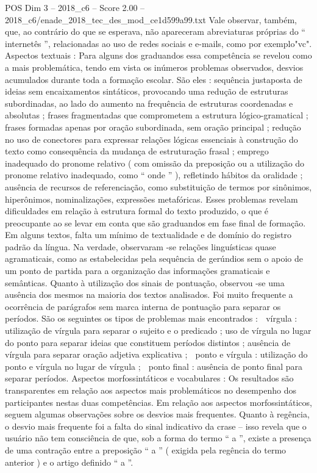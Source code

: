 \begin{textsample}{POS Dim 3 – 2018\_c6 – Score 2.00 – 2018\_c6/enade\_2018\_tec\_des\_mod\_ce1d599a99.txt}
Vale observar, também, que, ao contrário do que se esperava, não apareceram abreviaturas próprias do “ internetês ”, relacionadas ao uso de redes sociais e e-mails, como por exemplo"vc".
Aspectos textuais : Para alguns dos graduandos essa competência se revelou como a mais problemática, tendo em vista os inúmeros problemas observados, desvios acumulados durante toda a formação escolar.
São eles : sequência justaposta de ideias sem encaixamentos sintáticos, provocando uma redução de estruturas subordinadas, ao lado do aumento na frequência de estruturas coordenadas e absolutas ; frases fragmentadas que comprometem a estrutura lógico-gramatical ; frases formadas apenas por oração subordinada, sem oração principal ; redução no uso de conectores para expressar relações lógicas essenciais à construção do texto como consequência da mudança de estruturação frasal ; emprego inadequado do pronome relativo ( com omissão da preposição ou a utilização do pronome relativo inadequado, como “ onde ” ), refletindo hábitos da oralidade ; ausência de recursos de referenciação, como substituição de termos por sinônimos, hiperônimos, nominalizações, expressões metafóricas.
Esses problemas revelam dificuldades em relação à estrutura formal do texto produzido, o que é preocupante ao se levar em conta que são graduandos em fase final de formação.
Em alguns textos, falta um mínimo de textualidade e de domínio do registro padrão da língua.
Na verdade, observaram -se relações linguísticas quase agramaticais, como as estabelecidas pela sequência de gerúndios sem o apoio de um ponto de partida para a organização das informações gramaticais e semânticas.
Quanto à utilização dos sinais de pontuação, observou -se uma ausência dos mesmos na maioria dos textos analisados.
Foi muito frequente a ocorrência de parágrafos sem marca interna de pontuação para separar os períodos.
São os seguintes os tipos de problemas mais encontrados :  vírgula : utilização de vírgula para separar o sujeito e o predicado ; uso de vírgula no lugar do ponto para separar ideias que constituem períodos distintos ; ausência de vírgula para separar oração adjetiva explicativa ;  ponto e vírgula : utilização do ponto e vírgula no lugar de vírgula ;  ponto final : ausência de ponto final para separar períodos.
Aspectos morfossintáticos e vocabulares : Os resultados são transparentes em relação aos aspectos mais problemáticos no desempenho dos participantes nestas duas competências.
Em relação aos aspectos morfossintáticos, seguem algumas observações sobre os desvios mais frequentes.
Quanto à regência, o desvio mais frequente foi a falta do sinal indicativo da crase – isso revela que o usuário não tem consciência de que, sob a forma do termo “ a ”, existe a presença de uma contração entre a preposição “ a ” ( exigida pela regência do termo anterior ) e o artigo definido “ a ”.

\end{textsample}
